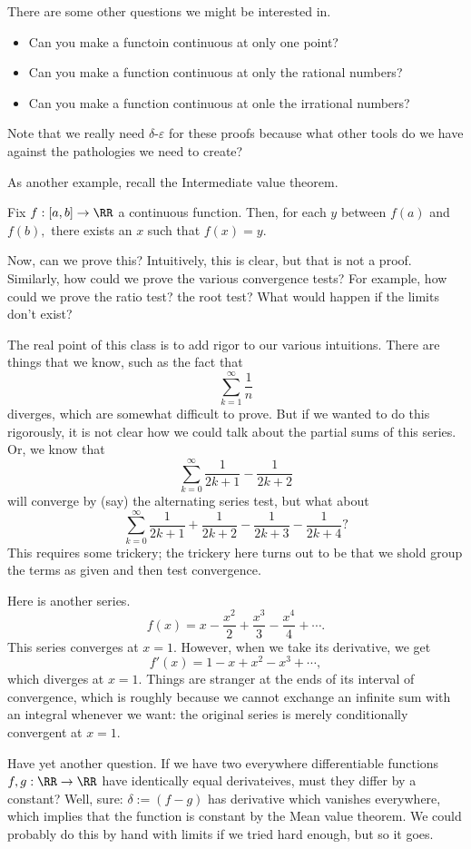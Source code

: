 \documentclass[../notes.tex]{subfiles}
\begin{document}
There are some other questions we might be interested in.
\begin{itemize}
	\item Can you make a functoin continuous at only one point?
	\item Can you make a function continuous at only the rational numbers?
	\item Can you make a function continuous at onle the irrational numbers?
\end{itemize}
Note that we really need $\delta$-$\varepsilon$ for these proofs because what other tools do we have against the pathologies we need to create?

As another example, recall the Intermediate value theorem.
\begin{thm}
	Fix $f:[a,b]\to\RR$ a continuous function. Then, for each $y$ between $f(a)$ and $f(b),$ there exists an $x$ such that $f(x)=y.$
\end{thm}
Now, can we prove this? Intuitively, this is clear, but that is not a proof. Similarly, how could we prove the various convergence tests? For example, how could we prove the ratio test? the root test? What would happen if the limits don't exist?

The real point of this class is to add rigor to our various intuitions. There are things that we know, such as the fact that
\[\sum_{k=1}^\infty\frac1n\]
diverges, which are somewhat difficult to prove. But if we wanted to do this rigorously, it is not clear how we could talk about the partial sums of this series. Or, we know that
\[\sum_{k=0}^\infty\frac1{2k+1}-\frac1{2k+2}\]
will converge by (say) the alternating series test, but what about
\[\sum_{k=0}^\infty\frac1{2k+1}+\frac1{2k+2}-\frac1{2k+3}-\frac1{2k+4}?\]
This requires some trickery; the trickery here turns out to be that we shold group the terms as given and then test convergence.

Here is another series.
\[f(x)=x-\frac{x^2}2+\frac{x^3}3-\frac{x^4}4+\cdots.\]
This series converges at $x=1.$ However, when we take its derivative, we get
\[f'(x)=1-x+x^2-x^3+\cdots,\]
which diverges at $x=1.$ Things are stranger at the ends of its interval of convergence, which is roughly because we cannot exchange an infinite sum with an integral whenever we want: the original series is merely conditionally convergent at $x=1.$

Have yet another question. If we have two everywhere differentiable functions $f,g:\RR\to\RR$ have identically equal derivateives, must they differ by a constant? Well, sure: $\delta:=(f-g)$ has derivative which vanishes everywhere, which implies that the function is constant by the Mean value theorem. We could probably do this by hand with limits if we tried hard enough, but so it goes.
\end{document}
